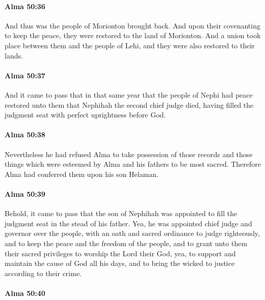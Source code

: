 		\paragraph{Alma 50:36} %
			\label{ALMA-50-36}

			And thus was the people of Morionton brought back.
			And upon their covenanting to keep the peace,
			they were restored to the land of Morionton.
			And a union took place between them and the people of Lehi,
			and they were also restored to their lands.

		\paragraph{Alma 50:37} %
			\label{ALMA-50-37}

			And it came to pass that in that same year
			that the people of Nephi had peace restored unto them
			that Nephihah the second chief judge died,
			having filled the judgment seat with perfect uprightness before God.

		\paragraph{Alma 50:38} %
			\label{ALMA-50-38}

			Nevertheless he had refused Alma
			to take possession of those records and those things
			which were esteemed by Alma and his fathers to be most sacred.
			Therefore Alma had conferred them upon his son Helaman.

		\paragraph{Alma 50:39} %
			\label{ALMA-50-39}

			Behold, it came to pass that the son of Nephihah was appointed
			to fill the judgment seat in the stead of his father.
			Yea, he was appointed chief judge and governor over the people,
			with an oath and sacred ordinance to judge righteously,
			and to keep the peace and the freedom of the people,
			and to grant unto them their sacred privileges to worship the Lord their God,
			yea, to support and maintain the cause of God all his days,
			and to bring the wicked to justice according to their crime.
			
		\paragraph{Alma 50:40} %
			\label{ALMA-50-40}

